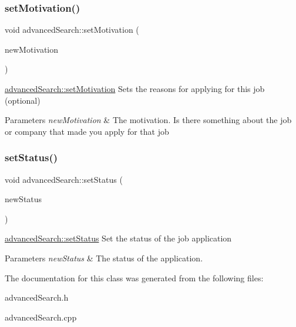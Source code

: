 \subsubsection{\texorpdfstring{setMotivation()}{setMotivation()}}
{\footnotesize\ttfamily void advanced\+Search\+::set\+Motivation (\begin{DoxyParamCaption}\item[{Q\+String}]{new\+Motivation }\end{DoxyParamCaption})}



\mbox{\hyperlink{classadvanced_search_a72e3b5ac068d875070165e865a03410c}{advanced\+Search\+::set\+Motivation}} Sets the reasons for applying for this job (optional) 


\begin{DoxyParams}{Parameters}
{\em new\+Motivation} & The motivation. Is there something about the job or company that made you apply for that job \\
\hline
\end{DoxyParams}
\mbox{\label{classadvanced_search_a1530d628ce32b4c867349a075b3828c3}} 
\subsubsection{\texorpdfstring{setStatus()}{setStatus()}}
{\footnotesize\ttfamily void advanced\+Search\+::set\+Status (\begin{DoxyParamCaption}\item[{Q\+String}]{new\+Status }\end{DoxyParamCaption})}



\mbox{\hyperlink{classadvanced_search_a1530d628ce32b4c867349a075b3828c3}{advanced\+Search\+::set\+Status}} Set the status of the job application 


\begin{DoxyParams}{Parameters}
{\em new\+Status} & The status of the application. \\
\hline
\end{DoxyParams}


The documentation for this class was generated from the following files\+:\begin{DoxyCompactItemize}
\item 
advanced\+Search.\+h\item 
advanced\+Search.\+cpp\end{DoxyCompactItemize}
